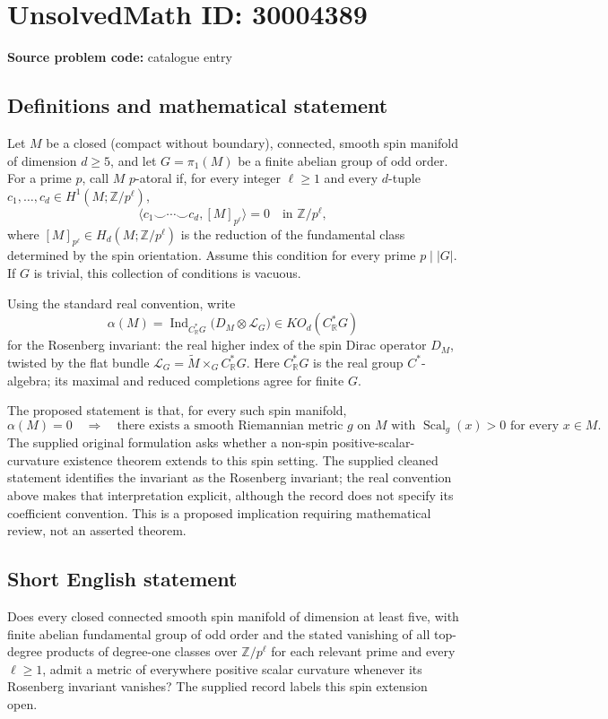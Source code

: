 \documentclass[11pt]{article}
\newcommand{\Z}{\mathbb{Z}}
\newcommand{\R}{\mathbb{R}}
\begin{document}
\section*{UnsolvedMath ID: 30004389}
\textbf{Source problem code:} catalogue entry
\subsection{Definitions and mathematical statement}
Let \(M\) be a closed (compact without boundary), connected, smooth spin manifold of dimension \(d\geq 5\), and let \(G=\pi_1(M)\) be a finite abelian group of odd order. For a prime \(p\), call \(M\) \(p\)-atoral if, for every integer \(\ell\geq 1\) and every \(d\)-tuple \(c_1,\ldots,c_d\in H^1(M;\Z/p^\ell)\),
\[
\bigl\langle c_1\smile\cdots\smile c_d,[M]_{p^\ell}\bigr\rangle=0\quad\text{in }\Z/p^\ell,
\]
where \([M]_{p^\ell}\in H_d(M;\Z/p^\ell)\) is the reduction of the fundamental class determined by the spin orientation. Assume this condition for every prime \(p\mid |G|\). If \(G\) is trivial, this collection of conditions is vacuous.

Using the standard real convention, write
\[
\alpha(M)=\operatorname{Ind}_{C^*_{\R}G}\bigl(D_M\otimes\mathcal L_G\bigr)\in KO_d(C^*_{\R}G)
\]
for the Rosenberg invariant: the real higher index of the spin Dirac operator \(D_M\), twisted by the flat bundle \(\mathcal L_G=\widetilde M\times_G C^*_{\R}G\). Here \(C^*_{\R}G\) is the real group \(C^*\)-algebra; its maximal and reduced completions agree for finite \(G\).

The proposed statement is that, for every such spin manifold,
\[
\alpha(M)=0\quad\Longrightarrow\quad
\text{there exists a smooth Riemannian metric }g\text{ on }M
\text{ with }\operatorname{Scal}_g(x)>0\text{ for every }x\in M.
\]
The supplied original formulation asks whether a non-spin positive-scalar-curvature existence theorem extends to this spin setting. The supplied cleaned statement identifies the invariant as the Rosenberg invariant; the real convention above makes that interpretation explicit, although the record does not specify its coefficient convention. This is a proposed implication requiring mathematical review, not an asserted theorem.
\subsection{Short English statement}
Does every closed connected smooth spin manifold of dimension at least five, with finite abelian fundamental group of odd order and the stated vanishing of all top-degree products of degree-one classes over \(\Z/p^\ell\) for each relevant prime and every \(\ell\geq1\), admit a metric of everywhere positive scalar curvature whenever its Rosenberg invariant vanishes? The supplied record labels this spin extension open.
\end{document}
